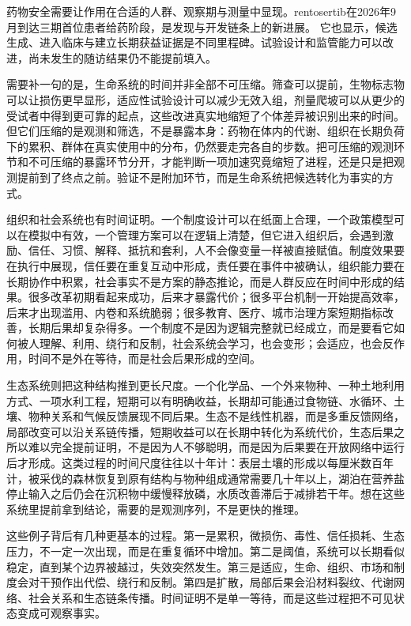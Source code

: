 药物安全需要让作用在合适的人群、观察期与测量中显现。rentosertib在2026年9月到达三期首位患者给药阶段，是发现与开发链条上的新进展。\cite{insilico2026phase3} 它也显示，候选生成、进入临床与建立长期获益证据是不同里程碑。试验设计和监管能力可以改进，尚未发生的随访结果仍不能提前填入。

需要补一句的是，生命系统的时间并非全部不可压缩。筛查可以提前，生物标志物可以让损伤更早显形，适应性试验设计可以减少无效入组，剂量爬坡可以从更少的受试者中得到更可靠的起点，这些改进真实地缩短了个体差异被识别出来的时间。但它们压缩的是观测和筛选，不是暴露本身：药物在体内的代谢、组织在长期负荷下的累积、群体在真实使用中的分布，仍然要走完各自的步数。把可压缩的观测环节和不可压缩的暴露环节分开，才能判断一项加速究竟缩短了进程，还是只是把观测提前到了终点之前。验证不是附加环节，而是生命系统把候选转化为事实的方式。


组织和社会系统也有时间证明。一个制度设计可以在纸面上合理，一个政策模型可以在模拟中有效，一个管理方案可以在逻辑上清楚，但它进入组织后，会遇到激励、信任、习惯、解释、抵抗和套利，人不会像变量一样被直接赋值。制度效果要在执行中展现，信任要在重复互动中形成，责任要在事件中被确认，组织能力要在长期协作中积累，社会事实不是方案的静态推论，而是人群反应在时间中形成的结果。很多改革初期看起来成功，后来才暴露代价；很多平台机制一开始提高效率，后来才出现滥用、内卷和系统脆弱；很多教育、医疗、城市治理方案短期指标改善，长期后果却复杂得多。一个制度不是因为逻辑完整就已经成立，而是要看它如何被人理解、利用、绕行和反制，社会系统会学习，也会变形；会适应，也会反作用，时间不是外在等待，而是社会后果形成的空间。

生态系统则把这种结构推到更长尺度。一个化学品、一个外来物种、一种土地利用方式、一项水利工程，短期可以有明确收益，长期却可能通过食物链、水循环、土壤、物种关系和气候反馈展现不同后果。生态不是线性机器，而是多重反馈网络，局部改变可以沿关系链传播，短期收益可以在长期中转化为系统代价，生态后果之所以难以完全提前证明，不是因为人不够聪明，而是因为后果要在开放网络中运行后才形成。这类过程的时间尺度往往以十年计：表层土壤的形成以每厘米数百年计，被采伐的森林恢复到原有结构与物种组成通常需要几十年以上，湖泊在营养盐停止输入之后仍会在沉积物中缓慢释放磷，水质改善滞后于减排若干年。想在这些系统里提前拿到结论，需要的是观测序列，不是更快的推理。

这些例子背后有几种更基本的过程。第一是累积，微损伤、毒性、信任损耗、生态压力，不一定一次出现，而是在重复循环中增加。第二是阈值，系统可以长期看似稳定，直到某个边界被越过，失效突然发生。第三是适应，生命、组织、市场和制度会对干预作出代偿、绕行和反制。第四是扩散，局部后果会沿材料裂纹、代谢网络、社会关系和生态链条传播。时间证明不是单一等待，而是这些过程把不可见状态变成可观察事实。

